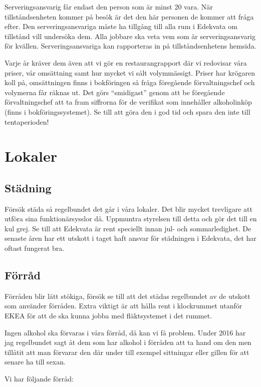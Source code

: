 \documentclass[10pt]{article}
\begin{document}
Serveringsansvarig får endast den person som är minst 20 vara. När tillståndsenheten kommer på besök är det den här personen de kommer att fråga efter. Den serveringsansvariga måste ha tillgång till alla rum i Edekvata om tillstånd vill undersöka dem. Alla jobbare ska veta vem som är serveringsansvarig för kvällen. Serveringsansvariga kan rapporteras in på tillståndsenhetens hemsida.

Varje år kräver dem även att vi gör en restaurangrapport där vi redovisar våra priser, vår omsättning samt hur mycket vi sålt volymmässigt. Priser har krögaren koll på, omsättningen finns i bokföringen så fråga föregående förvaltningschef och volymerna får räknas ut. Det görs ``smidigast'' genom att be föregående förvaltningschef att ta fram siffrorna för de verifikat som innehåller alkoholinköp (finns i bokföringssystemet). Se till att göra den i god tid och spara den inte till tentaperioden!

\section{Lokaler}

\subsection{Städning}

Försök städa så regelbundet det går i våra lokaler. Det blir mycket trevligare att utföra sina funktionärsysslor då. Uppmuntra styrelsen till detta och gör det till en kul grej. Se till att Edekvata är rent speciellt innan jul- och sommarledighet. De senaste åren har ett utskott i taget haft ansvar för städningen i Edekvata, det har oftast fungerat bra.

\subsection{Förråd}

Förråden blir lätt stökiga, försök se till att det städas regelbundet av de utskott som använder förråden. Extra viktigt är att hålla rent i klockrummet utanför EKEA för att de ska kunna jobba med fläktsystemet i det rummet.

Ingen alkohol ska förvaras i våra förråd, då kan vi få problem. Under 2016 har jag regelbundet sagt åt dem som har alkohol i förråden att ta hand om den men tillåtit att man förvarar den där under till exempel sittningar eller gillen för att senare ha till sexan.

Vi har följande förråd:
\end{document}
